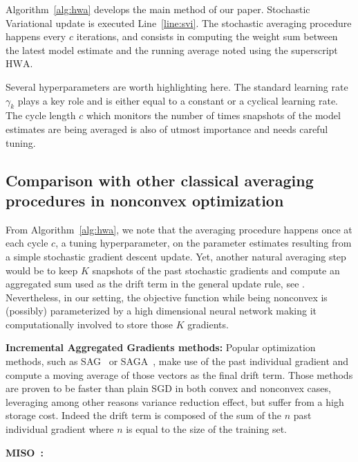 \documentclass{article} %
\begin{document}
Algorithm~\ref{alg:hwa} develops the main method of our paper.
Stochastic Variational update is executed Line~\ref{line:svi}.
The stochastic averaging procedure happens every $c$ iterations, and consists in computing the weight sum between the latest model estimate and the running average noted using the superscript $\textrm{HWA}$.

Several hyperparameters are worth highlighting here.
The standard learning rate $\gamma_k$ plays a key role and is either equal to a constant or a cyclical learning rate.
The cycle length $c$ which monitors the number of times snapshots of the model estimates are being averaged is also of utmost importance and needs careful tuning.


\subsection{Comparison with other classical averaging procedures in nonconvex optimization}
From Algorithm~\ref{alg:hwa}, we note that the averaging procedure happens once at each cycle $c$, a tuning hyperparameter, on the parameter estimates resulting from a simple stochastic gradient descent update.
Yet, another natural averaging step would be to keep $K$ snapshots of the past stochastic gradients and compute an aggregated sum used as the drift term in the general update rule, see \citep{zhou2017convergence}.
Nevertheless, in our setting, the objective function while being nonconvex is (possibly) parameterized by a high dimensional neural network making it computationally involved to store those $K$ gradients.


\textbf{Incremental Aggregated Gradients methods:} Popular optimization methods, such as SAG~\citep{schmidt2017minimizing} or SAGA~\citep{defazio2014saga}, make use of the past individual gradient and compute a moving average of those vectors as the final drift term. Those methods are proven to be faster than plain SGD in both convex and nonconvex cases, leveraging among other reasons variance reduction effect, but suffer from a high storage cost. Indeed the drift term is composed of the sum of the $n$ past individual gradient where $n$ is equal to the size of the training set.


\textbf{MISO~\citep{mairal2015incremental}:}
\end{document}
